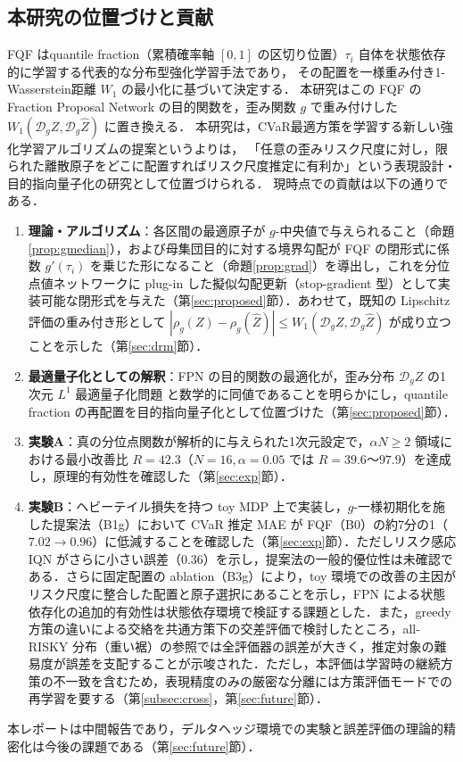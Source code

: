 \documentclass[a4paper,10pt]{jsarticle}
\theoremstyle{definition}
\newcommand{\Wone}{W_1}
\newcommand{\dist}{\mathcal{D}_g}
\begin{document}
\subsection{本研究の位置づけと貢献}
FQF \cite{yang2019fqf} はquantile fraction（累積確率軸 $[0, 1]$ の区切り位置）$\tau_i$ 自体を状態依存的に学習する代表的な分布型強化学習手法であり，
その配置を一様重み付き1-Wasserstein距離 $\Wone$ の最小化に基づいて決定する．
本研究はこの FQF の Fraction Proposal Network の目的関数を，歪み関数 $g$ で重み付けした $\Wone(\dist Z,\dist\hat{Z})$ に置き換える．
本研究は，CVaR最適方策を学習する新しい強化学習アルゴリズムの提案というよりは，
「任意の歪みリスク尺度に対し，限られた離散原子をどこに配置すればリスク尺度推定に有利か」という表現設計・目的指向量子化の研究として位置づけられる．
現時点での貢献は以下の通りである．
\begin{enumerate}
  \item \textbf{理論・アルゴリズム}：各区間の最適原子が $g$-中央値で与えられること（命題\ref{prop:gmedian}），および母集団目的に対する境界勾配が FQF の閉形式に係数 $g'(\tau_i)$ を乗じた形になること（命題\ref{prop:grad}）を導出し，これを分位点値ネットワークに plug-in した擬似勾配更新（stop-gradient 型）として実装可能な閉形式を与えた（第\ref{sec:proposed}節）．あわせて，既知の Lipschitz 評価の重み付き形として $|\rho_g(Z)-\rho_g(\hat Z)|\le \Wone(\dist Z,\dist \hat Z)$ が成り立つことを示した（第\ref{sec:drm}節）．
  \item \textbf{最適量子化としての解釈}：FPN の目的関数の最適化が，歪み分布 $\dist Z$ の1次元 $L^1$ 最適量子化問題 \cite{graf2000quantization} と数学的に同値であることを明らかにし，quantile fraction の再配置を目的指向量子化として位置づけた（第\ref{sec:proposed}節）．
  \item \textbf{実験A}：真の分位点関数が解析的に与えられた1次元設定で，$\alpha N\ge2$ 領域における最小改善比 $R=42.3$（$N=16, \alpha=0.05$ では $R=39.6$〜$97.9$）を達成し，原理的有効性を確認した（第\ref{sec:exp}節）．
  \item \textbf{実験B}：ヘビーテイル損失を持つ toy MDP 上で実装し，$g$-一様初期化を施した提案法（B1g）において CVaR 推定 MAE が FQF（B0）の約7分の1（$7.02\to0.96$）に低減することを確認した（第\ref{sec:exp}節）．ただしリスク感応 IQN がさらに小さい誤差（$0.36$）を示し，提案法の一般的優位性は未確認である．さらに固定配置の ablation（B3g）により，toy 環境での改善の主因がリスク尺度に整合した配置と原子選択にあることを示し，FPN による状態依存化の追加的有効性は状態依存環境で検証する課題とした．また，greedy 方策の違いによる交絡を共通方策下の交差評価で検討したところ，all-RISKY 分布（重い裾）の参照では全評価器の誤差が大きく，推定対象の難易度が誤差を支配することが示唆された．ただし，本評価は学習時の継続方策の不一致を含むため，表現精度のみの厳密な分離には方策評価モードでの再学習を要する（第\ref{subsec:cross}，第\ref{sec:future}節）．
\end{enumerate}
本レポートは中間報告であり，デルタヘッジ環境での実験と誤差評価の理論的精密化は今後の課題である（第\ref{sec:future}節）．
\end{document}
